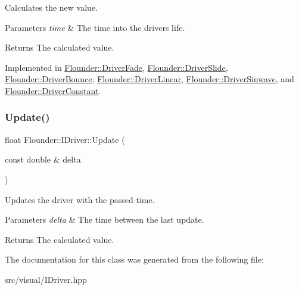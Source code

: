 Calculates the new value. 


\begin{DoxyParams}{Parameters}
{\em time} & The time into the drivers life. \\
\hline
\end{DoxyParams}
\begin{DoxyReturn}{Returns}
The calculated value. 
\end{DoxyReturn}


Implemented in \hyperlink{class_flounder_1_1_driver_fade_abf85b48408ddb95e57d1e93c3ea6eb09}{Flounder\+::\+Driver\+Fade}, \hyperlink{class_flounder_1_1_driver_slide_a32dcca0cbd41ff1c4e5e4eb494f4cf07}{Flounder\+::\+Driver\+Slide}, \hyperlink{class_flounder_1_1_driver_bounce_adaa9ef8c5e0b4cdab93c453258c001dd}{Flounder\+::\+Driver\+Bounce}, \hyperlink{class_flounder_1_1_driver_linear_adbe67b982e8b7a819ec613a83617d83b}{Flounder\+::\+Driver\+Linear}, \hyperlink{class_flounder_1_1_driver_sinwave_acb475a9bad5c9ae3d67ff3e74ce8bbb9}{Flounder\+::\+Driver\+Sinwave}, and \hyperlink{class_flounder_1_1_driver_constant_acdad6e0184d414f0e3d60f645c2d472d}{Flounder\+::\+Driver\+Constant}.

\mbox{\label{class_flounder_1_1_i_driver_af7831c5f86843234aa6815ccc5612471}} 
\subsubsection{\texorpdfstring{Update()}{Update()}}
{\footnotesize\ttfamily float Flounder\+::\+I\+Driver\+::\+Update (\begin{DoxyParamCaption}\item[{const double \&}]{delta }\end{DoxyParamCaption})\hspace{0.3cm}{\ttfamily [inline]}}



Updates the driver with the passed time. 


\begin{DoxyParams}{Parameters}
{\em delta} & The time between the last update. \\
\hline
\end{DoxyParams}
\begin{DoxyReturn}{Returns}
The calculated value. 
\end{DoxyReturn}


The documentation for this class was generated from the following file\+:\begin{DoxyCompactItemize}
\item 
src/visual/I\+Driver.\+hpp\end{DoxyCompactItemize}
